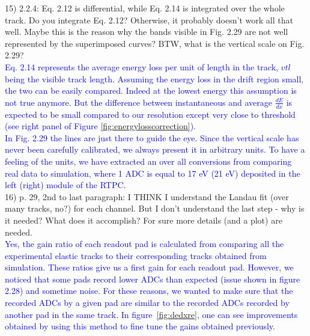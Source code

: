 15) 2.2.4: Eq. 2.12 is differential, while Eq. 2.14 is integrated over the 
whole track. Do you integrate Eq. 2.12? Otherwise, it probably doesn't work all 
that well. Maybe this is the reason why the bands visible in Fig. 2.29 are not 
well represented by the superimposed curves? BTW, what is the vertical scale on 
Fig. 2.29?\\
\textcolor{blue}{Eq. 2.14 represents the average energy loss per unit of length in the 
track, $vtl$ being the visible track length. Assuming the energy loss in the 
drift region small, the two can be easily compared. Indeed at the lowest energy 
this assumption is not true anymore. But the difference between instantaneous 
and average $\frac{dE}{dx}$ is expected to be small compared to our 
resolution except very close to threshold (see right panel of Figure 
\ref{fig:energylosscorrection}).} \\
\textcolor{blue}{In Fig. 2.29 the lines are just there to guide the eye. Since the
vertical scale has never been carefully calibrated, we always present it in
arbitrary units. To have a feeling of the units, we have extracted an over all 
conversions from comparing real data to simulation, where 1 ADC is equal to 17 eV 
(21 eV) deposited in the left (right) module of the RTPC.} \\


16) p. 29, 2nd to last paragraph: I THINK I understand the Landau fit (over 
many tracks, no?) for each channel. But I don't understand the last step - why 
is it needed? What does it accomplish? For sure more details (and a plot) are 
needed.\\
\textcolor{blue}{
Yes, the gain ratio of each readout pad is calculated from comparing all the 
experimental elastic tracks to their corresponding tracks obtained from 
simulation. These ratios give us a first gain for each readout pad. However, 
we noticed that some pads record lower ADCs than expected (issue shown in 
figure 2.28) and sometime noise. For these reasons, we wanted to make sure that the recorded 
ADCs by a given pad are similar to the recorded ADCs recorded by another pad in 
the same track. In figure~\ref{fig:dedxre}, one can see improvements obtained
by using this method to fine tune the gains obtained previously.} \\

